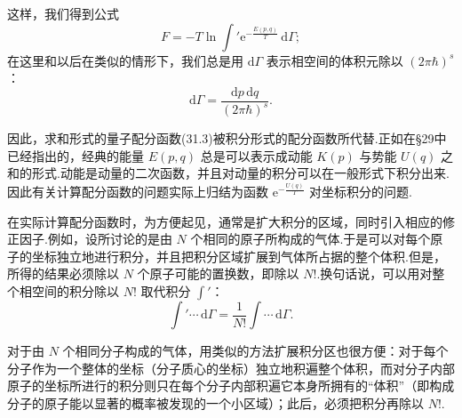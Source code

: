 这样，我们得到公式
\begin{equation}
  F=-T\ln\int'\mathrm{e}^{-\frac{E(p,q)}{T}}\,\mathrm{d}\varGamma;
\end{equation}
在这里和以后在类似的情形下，我们总是用 $\mathrm{d}\varGamma$ 表示相空间的体积元除以 $(2\pi\hbar)^s$：
\begin{equation}
  \mathrm{d}\varGamma=\frac{\mathrm{d}p\,\mathrm{d}q}{(2\pi\hbar)^s}.
\end{equation}

因此，求和形式的量子配分函数(31.3)被积分形式的配分函数所代替.正如在§29中已经指出的，经典的能量 $E(p,q)$ 总是可以表示成动能 $K(p)$ 与势能 $U(q)$ 之和的形式.动能是动量的二次函数，并且对动量的积分可以在一般形式下积分出来.因此有关计算配分函数的问题实际上归结为函数 $\mathrm{e}^{-\frac{U(q)}{T}}$ 对坐标积分的问题.

在实际计算配分函数时，为方便起见，通常是扩大积分的区域，同时引入相应的修正因子.例如，设所讨论的是由 $N$ 个相同的原子所构成的气体.于是可以对每个原子的坐标独立地进行积分，并且把积分区域扩展到气体所占据的整个体积.但是，所得的结果必须除以 $N$ 个原子可能的置换数，即除以 $N!$.换句话说，可以用对整个相空间的积分除以 $N!$ 取代积分 $\int'$：
\begin{equation}
  \int'\cdots\,\mathrm{d}\varGamma=\frac{1}{N!}\int\cdots\,\mathrm{d}\varGamma.
\end{equation}

对于由 $N$ 个相同分子构成的气体，用类似的方法扩展积分区也很方便：对于每个分子作为一个整体的坐标（分子质心的坐标）独立地积遍整个体积，而对分子内部原子的坐标所进行的积分则只在每个分子内部积遍它本身所拥有的“体积”（即构成分子的原子能以显著的概率被发现的一个小区域）；此后，必须把积分再除以 $N!$.

